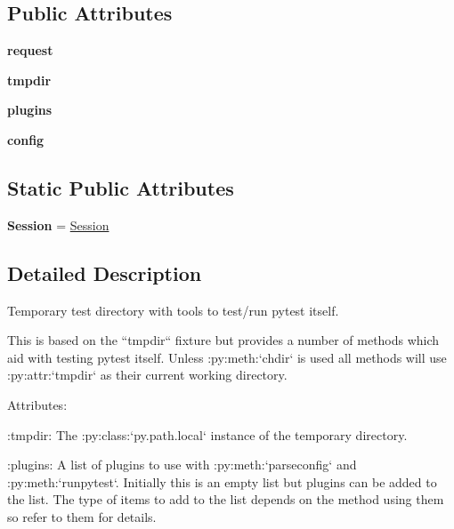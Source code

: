 \subsection*{Public Attributes}
\begin{DoxyCompactItemize}
\item 
\mbox{\label{class__pytest_1_1pytester_1_1_testdir_a08609b44544b25244dedfd1da90621a2}} 
{\bfseries request}
\item 
\mbox{\label{class__pytest_1_1pytester_1_1_testdir_ac9cb46c2dd0eaa75ef779ecad16b8d7a}} 
{\bfseries tmpdir}
\item 
\mbox{\label{class__pytest_1_1pytester_1_1_testdir_af4d280839ef00d5a6ce7401058ad0c3b}} 
{\bfseries plugins}
\item 
\mbox{\label{class__pytest_1_1pytester_1_1_testdir_a9c1b1ad466bfc862ef9bc15ac8282b25}} 
{\bfseries config}
\end{DoxyCompactItemize}
\subsection*{Static Public Attributes}
\begin{DoxyCompactItemize}
\item 
\mbox{\label{class__pytest_1_1pytester_1_1_testdir_a89f6cc6f36afc6f97e7712820521edbd}} 
{\bfseries Session} = \hyperlink{class__pytest_1_1main_1_1_session}{Session}
\end{DoxyCompactItemize}


\subsection{Detailed Description}
\begin{DoxyVerb}Temporary test directory with tools to test/run pytest itself.

This is based on the ``tmpdir`` fixture but provides a number of methods
which aid with testing pytest itself.  Unless :py:meth:`chdir` is used all
methods will use :py:attr:`tmpdir` as their current working directory.

Attributes:

:tmpdir: The :py:class:`py.path.local` instance of the temporary directory.

:plugins: A list of plugins to use with :py:meth:`parseconfig` and
   :py:meth:`runpytest`.  Initially this is an empty list but plugins can
   be added to the list.  The type of items to add to the list depends on
   the method using them so refer to them for details.\end{DoxyVerb}
 

